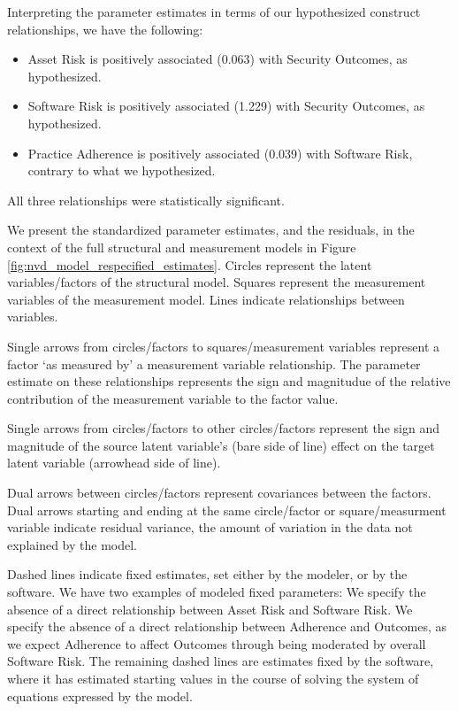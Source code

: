 Interpreting the parameter estimates in terms of our hypothesized construct relationships, we have the following:
\begin{itemize}
	\item  Asset Risk is positively associated (0.063) with Security Outcomes, as hypothesized.
	\item Software Risk is positively associated (1.229) with Security Outcomes, as hypothesized. 
	\item Practice Adherence is positively associated (0.039) with Software Risk, contrary to what we hypothesized. 
\end{itemize}	
	  All three relationships were statistically significant. 

We present the standardized parameter estimates, and the residuals, in the context of the full structural and measurement models in Figure \ref{fig:nvd_model_respecified_estimates}. Circles represent the latent variables/factors of the structural model. Squares represent the measurement variables of the measurement model. Lines indicate relationships between variables. 

Single arrows from circles/factors to squares/measurement variables represent a factor `as measured by' a measurement variable relationship. The parameter estimate on these relationships represents the sign and magnitudue of the relative contribution of the measurement variable to the factor value.  

Single arrows from circles/factors to other circles/factors represent the sign and magnitude of the source latent variable's (bare side of line) effect on the target latent variable (arrowhead side of line). 

Dual arrows between circles/factors represent covariances between the factors. Dual arrows starting and ending at the same circle/factor or square/measurment variable indicate residual variance, the amount of variation in the data not explained by the model. 

Dashed lines indicate fixed estimates, set either by the modeler, or by the software. We have two examples of modeled fixed parameters: We specify the absence of a direct relationship between Asset Risk and Software Risk. We specify the absence of a direct relationship between Adherence and Outcomes, as we expect Adherence to affect Outcomes through being moderated by overall Software Risk. The remaining dashed lines are estimates fixed by the software, where it has estimated starting values in the course of solving the system of equations expressed by the model.  

